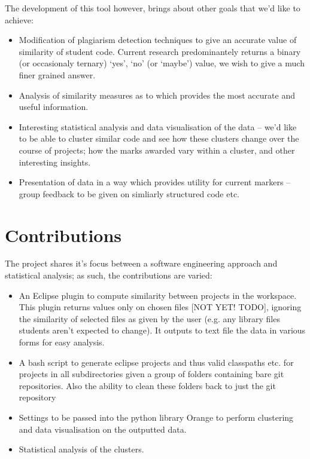 The development of this tool however, brings about other goals that we'd like to
achieve:
\begin{itemize}

\item Modification of plagiarism detection techniques to give an accurate value
of similarity of student code. Current research predominantely returns a binary
(or occasionaly ternary) `yes', `no' (or `maybe') value, we wish to give a much
finer grained answer.

\item Analysis of similarity measures as to which provides the most accurate
and useful information.

\item Interesting statistical analysis and data visualisation of the data -- 
we'd like to be able to cluster similar code and see how these clusters change
over the course of projects; how the marks awarded vary within a cluster, and
other interesting insights. 

\item Presentation of data in a way which provides utility for current markers
-- group feedback to be given on simliarly structured code etc.

\end{itemize}

\section{Contributions}

The project shares it's focus between a software engineering approach and statistical
analysis; as such, the contributions are varied:

\begin{itemize}

\item An Eclipse plugin to compute similarity between projects in the workspace.
This plugin returns values only on chosen files [NOT YET! TODO], ignoring the
similarity of selected files as given by the user (e.g. any library files students
aren't expected to change). It outputs to text file the data in various forms
for easy analysis.

\item A bash script to generate eclipse projects and thus valid classpaths etc.
for projects in all subdirectories given a group of folders containing bare git
repositories. Also the ability to clean these folders back to just the git
repository

\item Settings to be passed into the python library Orange to perform clustering
and data visualisation on the outputted data.

\item Statistical analysis of the clusters.

\end{itemize}
